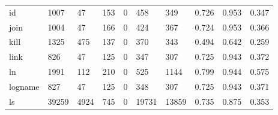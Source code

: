\begin{longtable}{lp{2.0cm}p{2.0cm}p{2.0cm}p{2.0cm}p{2.0cm}p{2.0cm}p{2.0cm}p{2.0cm}p{2.0cm}}
id        &                   1007 &                                 47 &                               153 &                                0 &                               458 &                             349 &                                   0.726 &                                  0.953 &                                0.347 \\
join      &                   1004 &                                 47 &                               166 &                                0 &                               424 &                             367 &                                   0.724 &                                  0.953 &                                0.366 \\
kill      &                   1325 &                                475 &                               137 &                                0 &                               370 &                             343 &                                   0.494 &                                  0.642 &                                0.259 \\
link      &                    826 &                                 47 &                               125 &                                0 &                               347 &                             307 &                                   0.725 &                                  0.943 &                                0.372 \\
ln        &                   1991 &                                112 &                               210 &                                0 &                               525 &                            1144 &                                   0.799 &                                  0.944 &                                0.575 \\
logname   &                    827 &                                 47 &                               125 &                                0 &                               348 &                             307 &                                   0.725 &                                  0.943 &                                0.371 \\
ls        &                  39259 &                               4924 &                               745 &                                0 &                             19731 &                           13859 &                                   0.735 &                                  0.875 &                                0.353 \\

\end{longtable}
